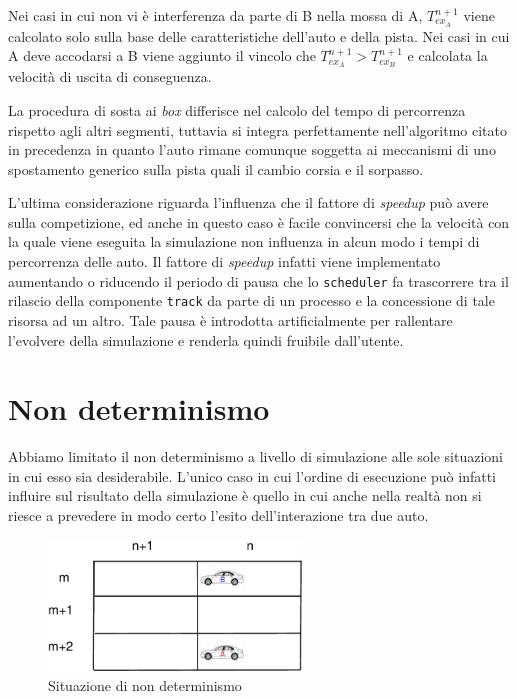 \documentclass[11pt,a4paper]{report}
\begin{document}
Nei casi in cui non vi è interferenza da parte di B nella mossa di A, $T_{ex_A}^{n+1}$ viene calcolato solo sulla base delle caratteristiche dell'auto e della pista.
Nei casi in cui A deve accodarsi a B viene aggiunto il vincolo che $T_{ex_A}^{n+1} > T_{ex_B}^{n+1}$ e calcolata la velocità di uscita di conseguenza.

La procedura di sosta ai \textit{box} differisce nel calcolo del tempo di percorrenza rispetto agli altri segmenti, tuttavia si integra perfettamente nell'algoritmo citato in precedenza in quanto l'auto rimane comunque soggetta ai meccanismi di uno spostamento generico sulla pista quali il cambio corsia e il sorpasso.


L'ultima considerazione riguarda l'influenza che il fattore di \textit{speedup} può avere sulla competizione, ed anche in questo caso è facile convincersi che la velocità con la quale viene eseguita la simulazione non influenza in alcun modo i tempi di percorrenza delle auto. Il fattore di \textit{speedup} infatti viene implementato aumentando o riducendo il periodo di pausa che lo \texttt{scheduler} fa trascorrere tra il rilascio della componente \texttt{track} da parte di un processo e la concessione di tale risorsa ad un altro. Tale pausa è introdotta artificialmente per rallentare l'evolvere della simulazione e renderla quindi fruibile dall'utente.

\section{Non determinismo}
Abbiamo limitato il non determinismo a livello di simulazione alle sole situazioni in cui esso sia desiderabile. L'unico caso in cui l'ordine di esecuzione può infatti influire sul risultato della simulazione è quello in cui anche nella realtà non si riesce a prevedere in modo certo l'esito dell'interazione tra due auto.

\begin{figure}
\begin{center}
\includegraphics[width=0.6\textwidth]{diagrammi/NonDet}
\caption{Situazione di non determinismo}
\label{fig:nonDet}
\end{center}
\end{figure}
\end{document}
